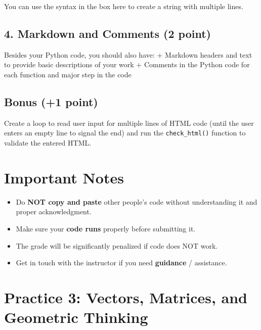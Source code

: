 \documentclass[
  letterpaper,
]{scrbook}
\providecommand{\tightlist}{%
  \setlength{\itemsep}{0pt}\setlength{\parskip}{0pt}}
\begin{document}
You can use the syntax in the box here to create a string with multiple
lines.

\section*{4. Markdown and Comments (2
point)}\label{markdown-and-comments-2-point}


Besides your Python code, you should also have: + Markdown headers and
text to provide basic descriptions of your work + Comments in the Python
code for each function and major step in the code

\section*{Bonus (+1 point)}\label{bonus-1-point}


Create a loop to read user input for multiple lines of HTML code (until
the user enters an empty line to signal the end) and run the
\texttt{check\_html()} function to validate the entered HTML.

\chapter*{Important Notes}\label{important-notes}


\begin{itemize}
\tightlist
\item
  Do \textbf{NOT copy and paste} other people's code without
  understanding it and proper acknowledgment.
\item
  Make sure your \textbf{code runs} properly before submitting it.
\item
  The grade will be significantly penalized if code does NOT work.
\item
  Get in touch with the instructor if you need \textbf{guidance} /
  assistance.
\end{itemize}

\chapter*{Practice 3: Vectors, Matrices, and Geometric
Thinking}\label{ch-practice-03}
\end{document}
